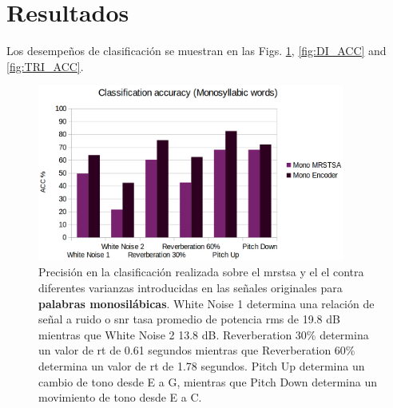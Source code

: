 \section{Resultados}

Los desempeños de clasificación se muestran en las Figs. \ref{fig:MONO_ACC}, \ref{fig:DI_ACC} and \ref{fig:TRI_ACC}.


\begin{figure}[h!]
    \centering
    \includegraphics[width=0.9\textwidth]{MONO_ACC.png}
    \caption{Precisión en la clasificación realizada sobre el \gls{mrstsa} y el \gls{el} contra diferentes varianzas introducidas en las señales originales
    para \textbf{palabras monosilábicas}.
    White Noise 1 determina una relación de señal a ruido o \gls{snr} tasa promedio de potencia \gls{rms} de 19.8 dB mientras que White Noise 2 13.8 dB.
    Reverberation 30\% determina un valor de \gls{rt} de 0.61 segundos mientras que Reverberation 60\% determina un valor de \gls{rt} de 1.78 segundos.
    Pitch Up determina un cambio de tono desde E a G, mientras que Pitch Down determina un movimiento de tono desde E a C.}
    \label{fig:MONO_ACC}
\end{figure}


